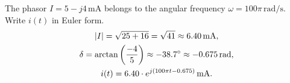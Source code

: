 \begin{exempel}
The phasor $I = 5 - j4\,\text{mA}$ belongs to the angular frequency $\omega = 100\pi\,\text{rad/s}$.
Write $i(t)$ in Euler form.
\begin{gather*}
  \lvert I\rvert = \sqrt{25 + 16} = \sqrt{41} \approx 6.40\,\text{mA}, \\
  \delta = \arctan\left(\frac{-4}{5}\right) \approx -38.7^{\circ} \approx -0.675\,\text{rad}, \\
  i(t) = 6.40 \cdot e^{j(100\pi t - 0.675)}\,\text{mA}.
\end{gather*}
\end{exempel}

